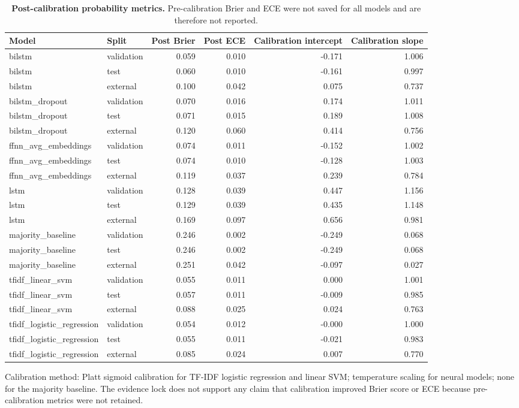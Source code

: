 \begin{table}[!ht]
\centering
\caption{\textbf{Post-calibration probability metrics.} Pre-calibration Brier and ECE were not saved for all models and are therefore not reported.}
\small
\begin{tabular}{llrrrr}
\hline
Model & Split & Post Brier & Post ECE & Calibration intercept & Calibration slope \\
\hline
bilstm & validation & 0.059 & 0.010 & -0.171 & 1.006 \\
bilstm & test & 0.060 & 0.010 & -0.161 & 0.997 \\
bilstm & external & 0.100 & 0.042 & 0.075 & 0.737 \\
bilstm\_dropout & validation & 0.070 & 0.016 & 0.174 & 1.011 \\
bilstm\_dropout & test & 0.071 & 0.015 & 0.189 & 1.008 \\
bilstm\_dropout & external & 0.120 & 0.060 & 0.414 & 0.756 \\
ffnn\_avg\_embeddings & validation & 0.074 & 0.011 & -0.152 & 1.002 \\
ffnn\_avg\_embeddings & test & 0.074 & 0.010 & -0.128 & 1.003 \\
ffnn\_avg\_embeddings & external & 0.119 & 0.037 & 0.239 & 0.784 \\
lstm & validation & 0.128 & 0.039 & 0.447 & 1.156 \\
lstm & test & 0.129 & 0.039 & 0.435 & 1.148 \\
lstm & external & 0.169 & 0.097 & 0.656 & 0.981 \\
majority\_baseline & validation & 0.246 & 0.002 & -0.249 & 0.068 \\
majority\_baseline & test & 0.246 & 0.002 & -0.249 & 0.068 \\
majority\_baseline & external & 0.251 & 0.042 & -0.097 & 0.027 \\
tfidf\_linear\_svm & validation & 0.055 & 0.011 & 0.000 & 1.001 \\
tfidf\_linear\_svm & test & 0.057 & 0.011 & -0.009 & 0.985 \\
tfidf\_linear\_svm & external & 0.088 & 0.025 & 0.024 & 0.763 \\
tfidf\_logistic\_regression & validation & 0.054 & 0.012 & -0.000 & 1.000 \\
tfidf\_logistic\_regression & test & 0.055 & 0.011 & -0.021 & 0.983 \\
tfidf\_logistic\_regression & external & 0.085 & 0.024 & 0.007 & 0.770 \\
\hline
\end{tabular}
\begin{flushleft}\footnotesize Calibration method: Platt sigmoid calibration for TF-IDF logistic regression and linear SVM; temperature scaling for neural models; none for the majority baseline. The evidence lock does not support any claim that calibration improved Brier score or ECE because pre-calibration metrics were not retained.\end{flushleft}
\label{tab:calibration}
\end{table}
